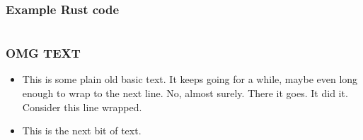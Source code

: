 \documentclass{beamer}
\begin{document}
\begin{frame}[fragile]
  \frametitle{Example Rust code}
  \inputminted{rust}{code.rs}
\end{frame}

\begin{frame}[fragile]
  \frametitle{OMG TEXT}

  \begin{itemize}
    \item This is some plain old basic text. It keeps going for a while, maybe
      even long enough to wrap to the next line. No, almost surely. There it
      goes. It did it. Consider this line wrapped.

    \item This is the next bit of text.

  \end{itemize}
\end{frame}
\end{document}

